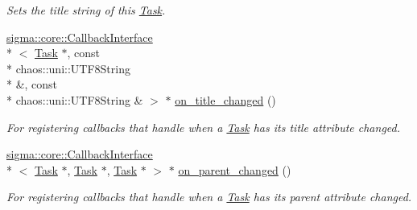 \begin{DoxyCompactItemize}
\begin{DoxyCompactList}\small\item\em Sets the title string of this \hyperlink{classsigma_1_1core_1_1tasks_1_1_task}{Task}. \end{DoxyCompactList}\item 
\hyperlink{classsigma_1_1core_1_1_callback_interface}{sigma\-::core\-::\-Callback\-Interface}\\*
$<$ \hyperlink{classsigma_1_1core_1_1tasks_1_1_task}{Task} $\ast$, const \\*
chaos\-::uni\-::\-U\-T\-F8\-String \\*
\&, const \\*
chaos\-::uni\-::\-U\-T\-F8\-String \& $>$ $\ast$ \hyperlink{classsigma_1_1core_1_1tasks_1_1_task_afb01222cabc945022f095921437a10a0}{on\-\_\-title\-\_\-changed} ()
\begin{DoxyCompactList}\small\item\em For registering callbacks that handle when a \hyperlink{classsigma_1_1core_1_1tasks_1_1_task}{Task} has its title attribute changed. \end{DoxyCompactList}\item 
\hyperlink{classsigma_1_1core_1_1_callback_interface}{sigma\-::core\-::\-Callback\-Interface}\\*
$<$ \hyperlink{classsigma_1_1core_1_1tasks_1_1_task}{Task} $\ast$, \hyperlink{classsigma_1_1core_1_1tasks_1_1_task}{Task} $\ast$, \hyperlink{classsigma_1_1core_1_1tasks_1_1_task}{Task} $\ast$ $>$ $\ast$ \hyperlink{classsigma_1_1core_1_1tasks_1_1_task_a4947e26b1208f36cf4bab3f2091db786}{on\-\_\-parent\-\_\-changed} ()
\begin{DoxyCompactList}\small\item\em For registering callbacks that handle when a \hyperlink{classsigma_1_1core_1_1tasks_1_1_task}{Task} has its parent attribute changed. \end{DoxyCompactList}\end{DoxyCompactItemize}
